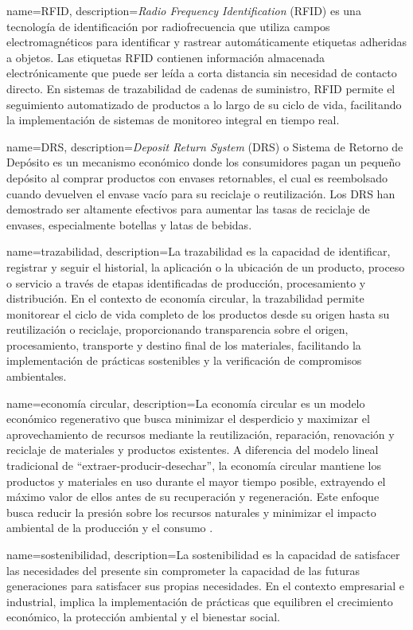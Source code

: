 {
    name=RFID,
    description={\textit{Radio Frequency Identification} (RFID) es una tecnología de identificación por radiofrecuencia que utiliza campos electromagnéticos para identificar y rastrear automáticamente etiquetas adheridas a objetos. Las etiquetas RFID contienen información almacenada electrónicamente que puede ser leída a corta distancia sin necesidad de contacto directo. En sistemas de trazabilidad de cadenas de suministro, RFID permite el seguimiento automatizado de productos a lo largo de su ciclo de vida, facilitando la implementación de sistemas de monitoreo integral en tiempo real.}
}

{
    name=DRS,
    description={\textit{Deposit Return System} (DRS) o Sistema de Retorno de Depósito es un mecanismo económico donde los consumidores pagan un pequeño depósito al comprar productos con envases retornables, el cual es reembolsado cuando devuelven el envase vacío para su reciclaje o reutilización. Los DRS han demostrado ser altamente efectivos para aumentar las tasas de reciclaje de envases, especialmente botellas y latas de bebidas.}
}

{
    name=trazabilidad,
    description={La trazabilidad es la capacidad de identificar, registrar y seguir el historial, la aplicación o la ubicación de un producto, proceso o servicio a través de etapas identificadas de producción, procesamiento y distribución. En el contexto de economía circular, la trazabilidad permite monitorear el ciclo de vida completo de los productos desde su origen hasta su reutilización o reciclaje, proporcionando transparencia sobre el origen, procesamiento, transporte y destino final de los materiales, facilitando la implementación de prácticas sostenibles y la verificación de compromisos ambientales.}
}

{
    name=economía circular,
    description={La economía circular es un modelo económico regenerativo que busca minimizar el desperdicio y maximizar el aprovechamiento de recursos mediante la reutilización, reparación, renovación y reciclaje de materiales y productos existentes. A diferencia del modelo lineal tradicional de ``extraer-producir-desechar'', la economía circular mantiene los productos y materiales en uso durante el mayor tiempo posible, extrayendo el máximo valor de ellos antes de su recuperación y regeneración. Este enfoque busca reducir la presión sobre los recursos naturales y minimizar el impacto ambiental de la producción y el consumo \cite{cerda2016economia}.}
}

{
    name=sostenibilidad,
    description={La sostenibilidad es la capacidad de satisfacer las necesidades del presente sin comprometer la capacidad de las futuras generaciones para satisfacer sus propias necesidades. En el contexto empresarial e industrial, implica la implementación de prácticas que equilibren el crecimiento económico, la protección ambiental y el bienestar social.}
}
